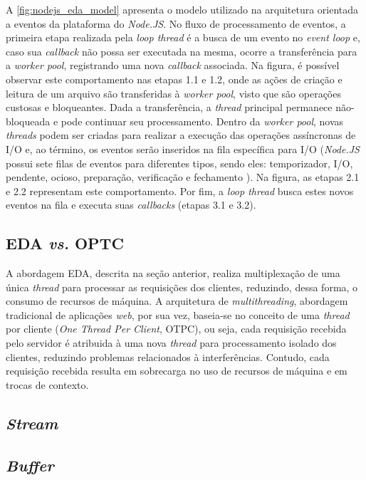 \documentclass[12pt]{article}
\begin{document}
A \autoref{fig:nodejs_eda_model} apresenta o modelo utilizado na arquitetura orientada a eventos da plataforma do 
\textit{Node.JS}. No fluxo de processamento de eventos, a primeira etapa realizada pela \textit{loop thread} é 
a busca de um evento no \textit{event loop} e, caso sua \textit{callback} não possa ser executada na mesma, ocorre
a transferência para a \textit{worker pool}, registrando uma nova \textit{callback} associada. 
Na figura, é possível observar este comportamento nas etapas 1.1 e 1.2, onde as ações de criação e leitura de 
um arquivo são transferidas à \textit{worker pool}, visto que são operações custosas e bloqueantes. Dada 
a transferência, a \textit{thread} principal permanece não-bloqueada e pode continuar seu processamento. 
Dentro da \textit{worker pool}, novas \textit{threads} podem ser criadas para realizar a execução das operações
assíncronas de I/O e, ao término, os eventos serão inseridos na fila específica para I/O (\textit{Node.JS} 
possui sete filas de eventos para diferentes tipos, sendo eles: temporizador, I/O, pendente, ocioso, preparação, 
verificação e fechamento \cite{NODEEVENTLOOP}). Na figura, as etapas 2.1 e 2.2 representam este comportamento.
Por fim, a \textit{loop thread} busca estes novos eventos na fila e executa suas 
\textit{callbacks} (etapas 3.1 e 3.2).\cite{BUGS}


\subsection{EDA \textit{vs.} OPTC}

A abordagem EDA, descrita na seção anterior, realiza multiplexação de uma única \textit{thread} para processar 
as requisições dos clientes, reduzindo, dessa forma, o consumo de recursos de máquina. 
A arquitetura de \textit{multithreading}, abordagem tradicional de aplicações \textit{web}, por sua vez, baseia-se
no conceito de uma \textit{thread} por cliente (\textit{One Thread Per Client}, OTPC), ou seja, cada requisição
recebida pelo servidor é atribuida à uma nova \textit{thread} para processamento isolado dos clientes, reduzindo
problemas relacionados à interferências. Contudo, cada requisição recebida resulta em sobrecarga no uso de
recursos de máquina e em trocas de contexto. \cite{JGD}


\subsection{\textit{Stream}}


\subsection{\textit{Buffer}}
\end{document}
